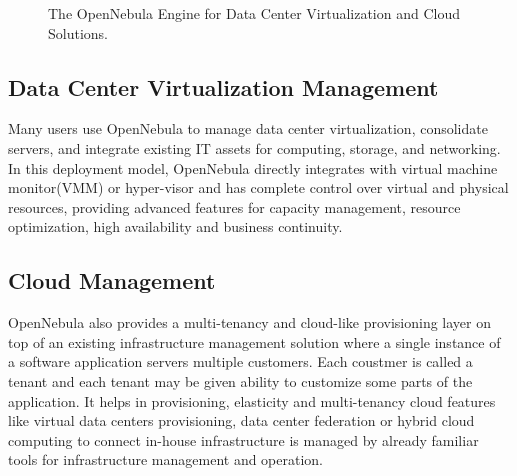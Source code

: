 \documentclass[9pt,twocolumn,twoside]{styles/osajnl}
\begin{document}
\begin{figure}[htbp]
	\centering
	\caption{{The OpenNebula Engine for Data Center Virtualization and 
		Cloud Solutions}\cite{www-opennebula-image}.}
	\label{fig:false-color}
\end{figure}

\subsection{Data Center Virtualization Management}

Many users use OpenNebula to manage {data center 
virtualization}\cite{www-dcv-opennebula}, 
consolidate servers, and integrate existing IT assets for computing, 
storage, and networking. In this deployment model, OpenNebula 
directly integrates with virtual machine monitor(VMM) or hyper-visor and
 has complete control over virtual and physical resources, providing advanced features 
for capacity management, resource optimization, high availability and 
business continuity. 

\subsection{Cloud Management}

OpenNebula also provides a multi-tenancy and cloud-like provisioning 
layer on top of an existing infrastructure management solution where a single instance
of a software application servers multiple customers. Each coustmer 
is called a tenant and each tenant may be given ability to customize 
some parts of the application. It helps in provisioning, elasticity and 
multi-tenancy cloud features like virtual data centers provisioning, 
data center federation or hybrid cloud computing to connect in-house 
infrastructure is managed by already familiar tools for 
infrastructure management and operation. 
\end{document}

